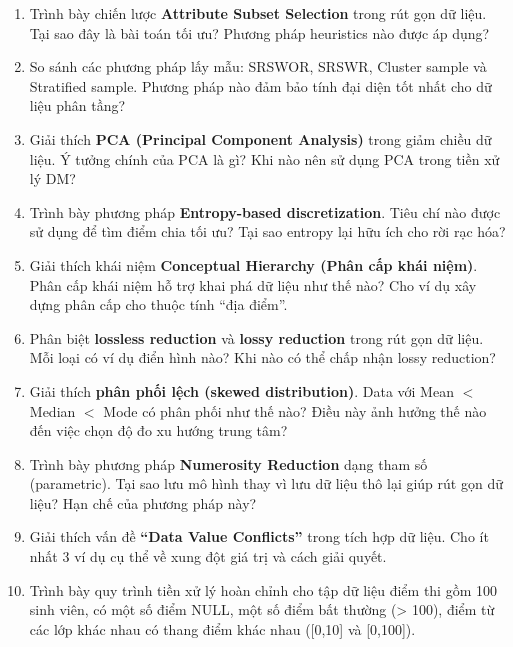 \documentclass[10pt]{article}
\begin{document}
\begin{enumerate}[leftmargin=*, label=\textbf{Câu \arabic*.}]
    \item Trình bày chiến lược \textbf{Attribute Subset Selection} trong rút gọn dữ liệu. Tại sao đây là bài toán tối ưu? Phương pháp heuristics nào được áp dụng?

    \item So sánh các phương pháp lấy mẫu: SRSWOR, SRSWR, Cluster sample và Stratified sample. Phương pháp nào đảm bảo tính đại diện tốt nhất cho dữ liệu phân tầng?

    \item Giải thích \textbf{PCA (Principal Component Analysis)} trong giảm chiều dữ liệu. Ý tưởng chính của PCA là gì? Khi nào nên sử dụng PCA trong tiền xử lý DM?

    \item Trình bày phương pháp \textbf{Entropy-based discretization}. Tiêu chí nào được sử dụng để tìm điểm chia tối ưu? Tại sao entropy lại hữu ích cho rời rạc hóa?

    \item Giải thích khái niệm \textbf{Conceptual Hierarchy (Phân cấp khái niệm)}. Phân cấp khái niệm hỗ trợ khai phá dữ liệu như thế nào? Cho ví dụ xây dựng phân cấp cho thuộc tính ``địa điểm''.

    \item Phân biệt \textbf{lossless reduction} và \textbf{lossy reduction} trong rút gọn dữ liệu. Mỗi loại có ví dụ điển hình nào? Khi nào có thể chấp nhận lossy reduction?

    \item Giải thích \textbf{phân phối lệch (skewed distribution)}. Data với Mean $<$ Median $<$ Mode có phân phối như thế nào? Điều này ảnh hưởng thế nào đến việc chọn độ đo xu hướng trung tâm?

    \item Trình bày phương pháp \textbf{Numerosity Reduction} dạng tham số (parametric). Tại sao lưu mô hình thay vì lưu dữ liệu thô lại giúp rút gọn dữ liệu? Hạn chế của phương pháp này?

    \item Giải thích vấn đề \textbf{``Data Value Conflicts''} trong tích hợp dữ liệu. Cho ít nhất 3 ví dụ cụ thể về xung đột giá trị và cách giải quyết.

    \item Trình bày quy trình tiền xử lý hoàn chỉnh cho tập dữ liệu điểm thi gồm 100 sinh viên, có một số điểm NULL, một số điểm bất thường (> 100), điểm từ các lớp khác nhau có thang điểm khác nhau ([0,10] và [0,100]).

\end{enumerate}
\end{document}
